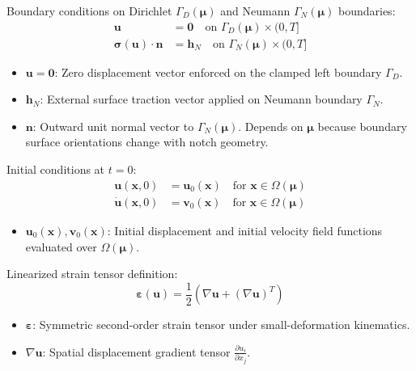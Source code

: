 \documentclass[12pt,a4paper,oneside]{report}
\newcommand{\vect}[1]{\mathbf{#1}}
\begin{document}
Boundary conditions on Dirichlet $\Gamma_D(\boldsymbol{\mu})$ and Neumann $\Gamma_N(\boldsymbol{\mu})$ boundaries:
\begin{align}
    \vect{u}                                     & = \vect{0} \quad \text{on } \Gamma_D(\boldsymbol{\mu}) \times (0, T]   \\
    \boldsymbol{\sigma}(\vect{u}) \cdot \vect{n} & = \vect{h}_N \quad \text{on } \Gamma_N(\boldsymbol{\mu}) \times (0, T]
\end{align}
\begin{tcolorbox}[colback=gray!5!white,colframe=gray!60!black,title={Term Definitions \& Parameter Dependencies}]
\begin{itemize}
    \item $\vect{u} = \vect{0}$: Zero displacement vector enforced on the clamped left boundary $\Gamma_D$.
    \item $\vect{h}_N$: External surface traction vector applied on Neumann boundary $\Gamma_N$.
    \item $\vect{n}$: Outward unit normal vector to $\Gamma_N(\boldsymbol{\mu})$. Depends on $\boldsymbol{\mu}$ because boundary surface orientations change with notch geometry.
\end{itemize}
\end{tcolorbox}

Initial conditions at $t = 0$:
\begin{align}
    \vect{u}(\vect{x}, 0)       & = \vect{u}_0(\vect{x}) \quad \text{for } \vect{x} \in \Omega(\boldsymbol{\mu}) \\
    \dot{\vect{u}}(\vect{x}, 0) & = \vect{v}_0(\vect{x}) \quad \text{for } \vect{x} \in \Omega(\boldsymbol{\mu})
\end{align}
\begin{tcolorbox}[colback=gray!5!white,colframe=gray!60!black,title={Term Definitions \& Parameter Dependencies}]
\begin{itemize}
    \item $\vect{u}_0(\vect{x}), \vect{v}_0(\vect{x})$: Initial displacement and initial velocity field functions evaluated over $\Omega(\boldsymbol{\mu})$.
\end{itemize}
\end{tcolorbox}

Linearized strain tensor definition:
\begin{equation}
    \boldsymbol{\varepsilon}(\vect{u}) = \frac{1}{2}\left(\nabla\vect{u} + (\nabla\vect{u})^T\right)
\end{equation}
\begin{tcolorbox}[colback=gray!5!white,colframe=gray!60!black,title={Term Definitions \& Parameter Dependencies}]
\begin{itemize}
    \item $\boldsymbol{\varepsilon}$: Symmetric second-order strain tensor under small-deformation kinematics.
    \item $\nabla\vect{u}$: Spatial displacement gradient tensor $\frac{\partial u_i}{\partial x_j}$.
\end{itemize}
\end{tcolorbox}
\end{document}
